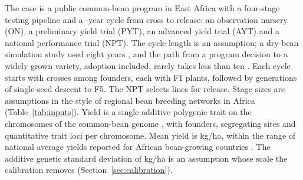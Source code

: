 The case is a public common-bean program in East Africa with a four-stage testing pipeline and a \NumCfgCycleYears{}-year cycle from cross to release: an observation nursery (ON), a preliminary yield trial (PYT), an advanced yield trial (AYT) and a national performance trial (NPT). The cycle length is an assumption; a dry-bean simulation study used eight years \citep{Lin2023Simulations}, and the path from a program decision to a widely grown variety, adoption included, rarely takes less than ten \citep{Kholova2021Pursuit}. Each cycle starts with \NumCfgNcrosses{} crosses among founders, each with \NumCfgNprogeny{} F1 plants, followed by \NumCfgNssd{} generations of single-seed descent to F5. The NPT selects \NumCfgNreleased{} lines for release. Stage sizes are assumptions in the style of regional bean breeding networks in Africa (Table~\ref{tab:inputs}). Yield is a single additive polygenic trait on the \NumCfgNchr{} chromosomes of the common-bean genome \citep{Schmutz2014Reference}, with \NumCfgNfounders{} founders, \NumCfgSegSites{} segregating sites and \NumCfgQTLperChr{} quantitative trait loci per chromosome. Mean yield is \NumCfgMeanYield{} kg/ha, within the range of national average yields reported for African bean-growing countries \citep{Beebe2013Phenotyping}. The additive genetic standard deviation of \NumCfgSigmaA{} kg/ha is an assumption whose scale the calibration removes (Section~\ref{sec:calibration}).

